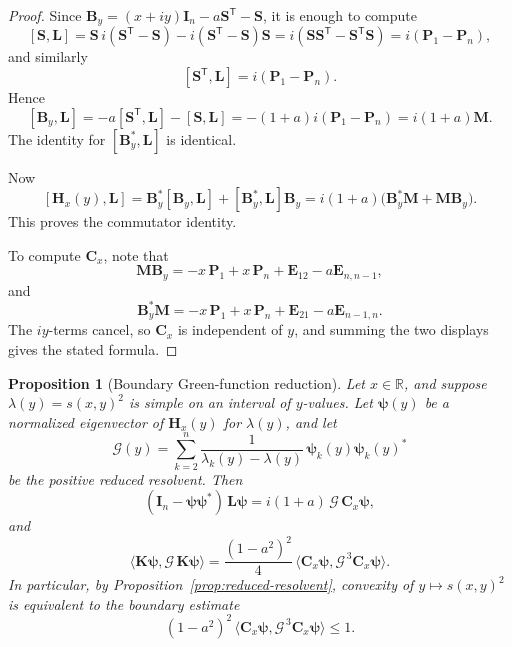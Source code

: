 \documentclass[11pt]{article}
\newtheorem{proposition}[theorem]{Proposition}
\begin{document}
\begin{proof}
Since \(\mathbf B_y=(x+iy)\mathbf I_n-a\mathbf S^{\mathsf T}-\mathbf S\), it is enough to compute
\[
[\mathbf S,\mathbf L]
=
\mathbf S\,i(\mathbf S^{\mathsf T}-\mathbf S)-i(\mathbf S^{\mathsf T}-\mathbf S)\mathbf S
=
i(\mathbf S\mathbf S^{\mathsf T}-\mathbf S^{\mathsf T}\mathbf S)
=
i(\mathbf P_1-\mathbf P_n),
\]
and similarly
\[
[\mathbf S^{\mathsf T},\mathbf L]
=
i(\mathbf P_1-\mathbf P_n).
\]
Hence
\[
[\mathbf B_y,\mathbf L]
=
-a[\mathbf S^{\mathsf T},\mathbf L]-[\mathbf S,\mathbf L]
=
-(1+a)i(\mathbf P_1-\mathbf P_n)
=
i(1+a)\mathbf M.
\]
The identity for \([\mathbf B_y^*,\mathbf L]\) is identical.

Now
\[
[\mathbf H_x(y),\mathbf L]
=
\mathbf B_y^*[\mathbf B_y,\mathbf L]+[\mathbf B_y^*,\mathbf L]\mathbf B_y
=
i(1+a)\bigl(\mathbf B_y^*\mathbf M+\mathbf M\mathbf B_y\bigr).
\]
This proves the commutator identity.

To compute \(\mathbf C_x\), note that
\[
\mathbf M\mathbf B_y
=
-x\,\mathbf P_1
+x\,\mathbf P_n
+\mathbf E_{12}
-a\mathbf E_{n,n-1},
\]
and
\[
\mathbf B_y^*\mathbf M
=
-x\,\mathbf P_1
+x\,\mathbf P_n
+\mathbf E_{21}
-a\mathbf E_{n-1,n}.
\]
The \(iy\)-terms cancel, so \(\mathbf C_x\) is independent of \(y\), and summing the two displays gives the stated formula.
\end{proof}

\begin{proposition}[Boundary Green-function reduction]\label{prop:boundary-green}
Let \(x\in\mathbb R\), and suppose \(\lambda(y)=s(x,y)^2\) is simple on an interval of \(y\)-values. Let \(\boldsymbol{\psi}(y)\) be a normalized eigenvector of \(\mathbf H_x(y)\) for \(\lambda(y)\), and let
\[
\mathcal G(y)
=
\sum_{k=2}^n \frac{1}{\lambda_k(y)-\lambda(y)}\,\boldsymbol{\psi}_k(y)\boldsymbol{\psi}_k(y)^*
\]
be the positive reduced resolvent. Then
\[
(\mathbf I_n-\boldsymbol{\psi}\boldsymbol{\psi}^*)\,\mathbf L\boldsymbol{\psi}
=
i(1+a)\,\mathcal G\,\mathbf C_x\boldsymbol{\psi},
\]
and
\[
\boxed{
\bigl\langle \mathbf K\boldsymbol{\psi},\mathcal G\,\mathbf K\boldsymbol{\psi}\bigr\rangle
=
\frac{(1-a^2)^2}{4}\,
\bigl\langle \mathbf C_x\boldsymbol{\psi},\mathcal G^{\,3}\mathbf C_x\boldsymbol{\psi}\bigr\rangle.
}
\]
In particular, by Proposition~\ref{prop:reduced-resolvent}, convexity of \(y\mapsto s(x,y)^2\) is equivalent to the boundary estimate
\[
(1-a^2)^2\,
\bigl\langle \mathbf C_x\boldsymbol{\psi},\mathcal G^{\,3}\mathbf C_x\boldsymbol{\psi}\bigr\rangle
\le 1.
\]
\end{proposition}
\end{document}
